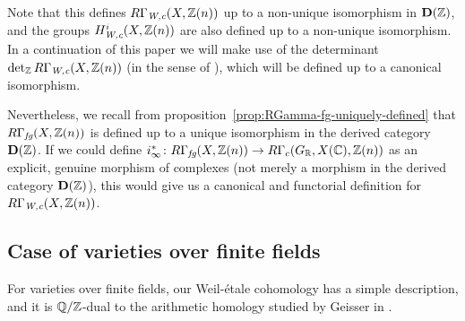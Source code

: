\documentclass{article}
\numberwithin{equation}{section}
\begin{document}
\begin{remark}
  Note that this defines $R\Gamma_{\text{\it W,c}} (X,\mathbb{Z}(n))$ up to a non-unique isomorphism
  in $\mathbf{D} (\mathbb{Z})$, and the groups $H_{\text{\it W,c}}^i (X, \mathbb{Z} (n))$ are also defined
  up to a non-unique isomorphism. In a continuation of this paper we will make
  use of the determinant $\operatorname{det}\nolimits_{\mathbb{Z}} R\Gamma_{\text{\it W,c}} (X,\mathbb{Z}(n))$ (in the
  sense of \cite{Knudsen-Mumford-1976}), which will be defined up to a canonical
  isomorphism.

  Nevertheless, we recall from proposition~\ref{prop:RGamma-fg-uniquely-defined}
  that $R\Gamma_{\text{\it fg}} (X, \mathbb{Z} (n))$ is defined up to a unique isomorphism in the
  derived category $\mathbf{D} (\mathbb{Z})$. If we could define
  $i_\infty^*\colon R\Gamma_{\text{\it fg}} (X, \mathbb{Z}(n)) \to R\Gamma_c (G_{\mathbb{R}}, X(\mathbb{C}), \mathbb{Z}(n))$
  as an explicit, genuine morphism of complexes (not merely a morphism in the
  derived category $\mathbf{D} (\mathbb{Z})$), this would give us a canonical and
  functorial definition for $R\Gamma_{\text{\it W,c}} (X, \mathbb{Z}(n))$.
\end{remark}

\subsection*{Case of varieties over finite fields}

For varieties over finite fields, our Weil-étale cohomology has a simple
description, and it is $\mathbb{Q}/\mathbb{Z}$-dual to the arithmetic homology studied by
Geisser in \cite{Geisser-2010-arithmetic-homology}.
\end{document}
